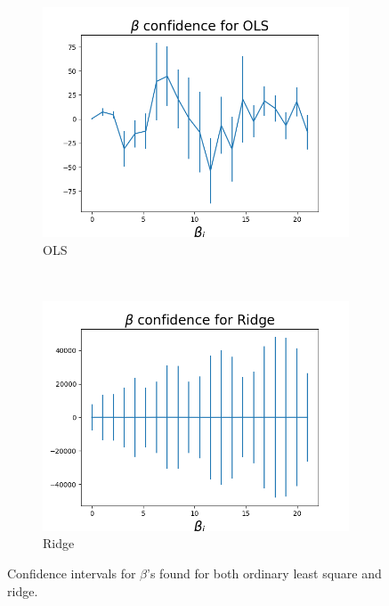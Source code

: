 \documentclass[12pt]{article}
\begin{document}
\begin{figure}[H]
\centering
\begin{subfigure}[t]{0.48\textwidth}
\includegraphics[width=\linewidth]{../figures/a-OLS-contour-beta-patchNone.png}
\caption{OLS}
\label{figRD:OLSconf}
\end{subfigure}
\ \
\begin{subfigure}[t]{0.48\textwidth}
\includegraphics[width = \linewidth]{../figures/b-Ridge-contour-beta-patchNone.png}
\caption{Ridge}
\label{figRD:Rconf}
\end{subfigure}
\caption{Confidence intervals for $\beta$'s found for both ordinary least square and ridge.}
\label{figRD:conf}
\end{figure}
\end{document}
